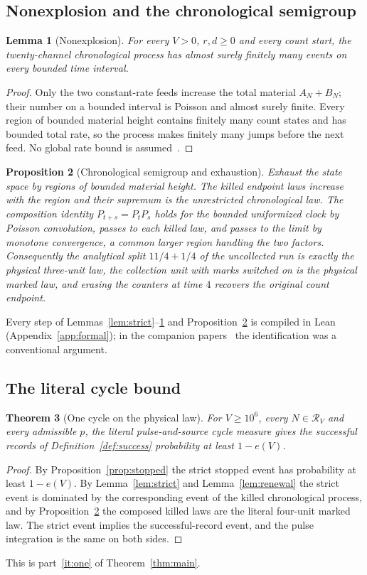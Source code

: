 \documentclass[11pt,a4paper]{article}
\theoremstyle{plain}
\newtheorem{theorem}{Theorem}[section]
\newtheorem{proposition}[theorem]{Proposition}
\newtheorem{lemma}[theorem]{Lemma}
\theoremstyle{definition}
\theoremstyle{remark}
\newcommand{\cR}{\mathcal R}
\begin{document}
\subsection{Nonexplosion and the chronological semigroup}
\begin{lemma}[Nonexplosion]\label{lem:nonexplosion}
For every $V>0$, $r,d\ge0$ and every count start, the twenty-channel chronological process has almost surely finitely many events on every bounded time interval.
\end{lemma}
\begin{proof}
Only the two constant-rate feeds increase the total material $A_N+B_N$; their number on a bounded interval is Poisson and almost surely finite. Every region of bounded material height contains finitely many count states and has bounded total rate, so the process makes finitely many jumps before the next feed. No global rate bound is assumed~\citep[cf.][]{norris1997,anderson2015}.
\end{proof}

\begin{proposition}[Chronological semigroup and exhaustion]\label{prop:semigroup}
Exhaust the state space by regions of bounded material height. The killed endpoint laws increase with the region and their supremum is the unrestricted chronological law. The composition identity $P_{t+s}=P_tP_s$ holds for the bounded uniformized clock by Poisson convolution, passes to each killed law, and passes to the limit by monotone convergence, a common larger region handling the two factors. Consequently the analytical split $11/4+1/4$ of the uncollected run is exactly the physical three-unit law, the collection unit with marks switched on is the physical marked law, and erasing the counters at time $4$ recovers the original count endpoint.
\end{proposition}
Every step of Lemmas~\ref{lem:strict}--\ref{lem:nonexplosion} and Proposition~\ref{prop:semigroup} is compiled in Lean (Appendix~\ref{app:formal}); in the companion papers~\citep{finitecopy2026,exporter2026} the identification was a conventional argument.

\subsection{The literal cycle bound}
\begin{theorem}[One cycle on the physical law]\label{thm:onecycle}
For $V\ge10^6$, every $N\in\cR_V$ and every admissible $p$, the literal pulse-and-source cycle measure gives the successful records of Definition~\ref{def:success} probability at least $1-e(V)$.
\end{theorem}
\begin{proof}
By Proposition~\ref{prop:stopped} the strict stopped event has probability at least $1-e(V)$. By Lemma~\ref{lem:strict} and Lemma~\ref{lem:renewal} the strict event is dominated by the corresponding event of the killed chronological process, and by Proposition~\ref{prop:semigroup} the composed killed laws are the literal four-unit marked law. The strict event implies the successful-record event, and the pulse integration is the same on both sides.
\end{proof}
This is part~\ref{it:one} of Theorem~\ref{thm:main}.
\end{document}
